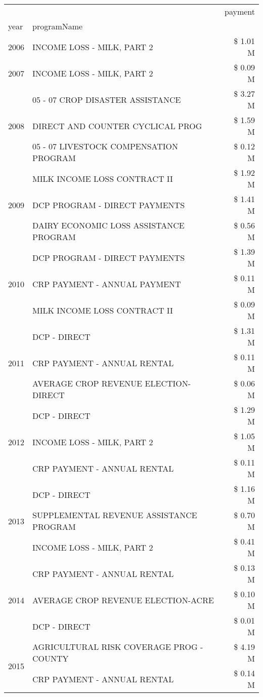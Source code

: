 \begin{tabular}{llr}
\toprule
 &  & payment \\
year & programName &  \\
\midrule
2006 & INCOME LOSS - MILK, PART 2 & \$ 1.01 M \\
\cline{1-3}
2007 & INCOME LOSS - MILK, PART 2 & \$ 0.09 M \\
\cline{1-3}
\multirow[t]{3}{*}{2008} & 05 - 07 CROP DISASTER ASSISTANCE & \$ 3.27 M \\
 & DIRECT AND COUNTER CYCLICAL PROG & \$ 1.59 M \\
 & 05 - 07 LIVESTOCK COMPENSATION PROGRAM & \$ 0.12 M \\
\cline{1-3}
\multirow[t]{3}{*}{2009} & MILK INCOME LOSS CONTRACT II & \$ 1.92 M \\
 & DCP PROGRAM - DIRECT PAYMENTS & \$ 1.41 M \\
 & DAIRY ECONOMIC LOSS ASSISTANCE PROGRAM & \$ 0.56 M \\
\cline{1-3}
\multirow[t]{3}{*}{2010} & DCP PROGRAM - DIRECT PAYMENTS & \$ 1.39 M \\
 & CRP PAYMENT - ANNUAL PAYMENT & \$ 0.11 M \\
 & MILK INCOME LOSS CONTRACT II & \$ 0.09 M \\
\cline{1-3}
\multirow[t]{3}{*}{2011} & DCP - DIRECT & \$ 1.31 M \\
 & CRP PAYMENT - ANNUAL RENTAL & \$ 0.11 M \\
 & AVERAGE CROP REVENUE ELECTION-DIRECT & \$ 0.06 M \\
\cline{1-3}
\multirow[t]{3}{*}{2012} & DCP - DIRECT & \$ 1.29 M \\
 & INCOME LOSS - MILK, PART 2 & \$ 1.05 M \\
 & CRP PAYMENT - ANNUAL RENTAL & \$ 0.11 M \\
\cline{1-3}
\multirow[t]{3}{*}{2013} & DCP - DIRECT & \$ 1.16 M \\
 & SUPPLEMENTAL REVENUE ASSISTANCE PROGRAM & \$ 0.70 M \\
 & INCOME LOSS - MILK, PART 2 & \$ 0.41 M \\
\cline{1-3}
\multirow[t]{3}{*}{2014} & CRP PAYMENT - ANNUAL RENTAL & \$ 0.13 M \\
 & AVERAGE CROP REVENUE ELECTION-ACRE & \$ 0.10 M \\
 & DCP - DIRECT & \$ 0.01 M \\
\cline{1-3}
\multirow[t]{3}{*}{2015} & AGRICULTURAL RISK COVERAGE PROG - COUNTY & \$ 4.19 M \\
 & CRP PAYMENT - ANNUAL RENTAL & \$ 0.14 M \\

\end{tabular}
